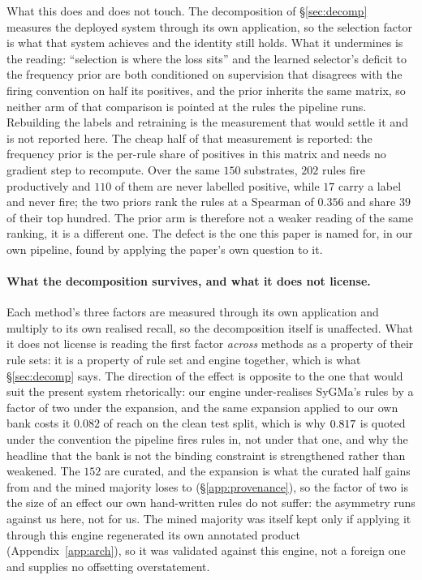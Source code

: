 What this does and does not touch. The decomposition of \S\ref{sec:decomp} measures the deployed
system through its own application, so the selection factor is what that system achieves and the
identity still holds. What it undermines is the reading: ``selection is where the loss sits'' and
the learned selector's deficit to the frequency prior are both conditioned on supervision that
disagrees with the firing convention on half its positives, and the prior inherits the same matrix,
so neither arm of that comparison is pointed at the rules the pipeline runs. Rebuilding the labels
and retraining is the measurement that would settle it and is not reported here. The cheap half of
that measurement is reported: the frequency prior is the per-rule share of positives in this matrix
and needs no gradient step to recompute. Over the same $150$ substrates, $202$ rules fire
productively and $110$ of them are never labelled positive, while $17$ carry a label and never fire;
the two priors rank the rules at a Spearman of $0.356$ and share $39$ of their top hundred. The prior
arm is therefore not a weaker reading of the same ranking, it is a different one. The defect is the
one this paper is named for, in our own pipeline, found by applying the paper's own question to it.

\paragraph{What the decomposition survives, and what it does not license.} Each method's three
factors are measured through its own application and multiply to its own realised recall, so the
decomposition itself is unaffected. What it does not license is reading the first factor
\emph{across} methods as a property of their rule sets: it is a property of rule set and engine
together, which is what \S\ref{sec:decomp} says. The direction of the effect is opposite to the one that would
suit the present system rhetorically: our engine under-realises
SyGMa's rules by a factor of two under the expansion, and the same expansion applied to our own bank
costs it $0.082$ of reach on the clean test split, which is why $0.817$ is quoted under the
convention the pipeline fires rules in, not under that one, and why the headline that the
bank is not the binding constraint is strengthened rather than weakened. The $152$ are curated, and
the expansion is what the curated half gains from and the mined majority loses to
(\S\ref{app:provenance}), so the factor of two is the size of an effect our own hand-written rules
do not suffer: the asymmetry runs against us here, not for us. The mined majority was itself
kept only if applying it through this engine regenerated its own annotated product
(Appendix~\ref{app:arch}), so it was validated against this engine, not a foreign one and
supplies no offsetting overstatement.

